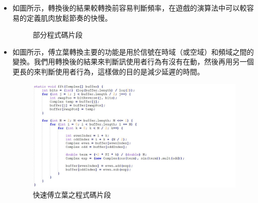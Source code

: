 \documentclass[12pt]{article}  %
\theoremstyle{plain}
\begin{document}
\begin{itemize}
\begin{itemize}
\item 如圖所示，轉換後的結果較轉換前容易判斷頻率，在遊戲的演算法中可以較容易的定義肌肉放鬆節奏的快慢。
\begin{figure}[h]  %
\quad
{}
\caption{部分程式碼片段}
\end{figure}

\item 如圖所示，傅立葉轉換主要的功能是用於信號在時域（或空域）和頻域之間的變換。我們用轉換後的結果來判斷訊使用者行為有沒有在動，然後再用另一個更長的來判斷使用者行為，這樣做的目的是減少延遲的時間。
\begin{figure}[h]  %
\centering
\includegraphics[width=15cm]{pic/ch3/code-快速傅立葉.JPG}
\caption{快速傅立葉之程式碼片段}
\end{figure}
\newpage


\end{itemize}
\end{itemize}
\end{document}
